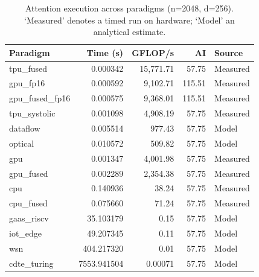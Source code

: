 \begin{table}[h]
\centering
\caption{Attention execution across paradigms (n=2048, d=256). `Measured' denotes a timed run on hardware; `Model' an analytical estimate.}
\begin{tabular}{lrrrl}
\hline
Paradigm & Time (s) & GFLOP/s & AI & Source \\
\hline
tpu\_fused & 0.000342 & 15,771.71 & 57.75 & Measured \\
gpu\_fp16 & 0.000592 & 9,102.71 & 115.51 & Measured \\
gpu\_fused\_fp16 & 0.000575 & 9,368.01 & 115.51 & Measured \\
tpu\_systolic & 0.001098 & 4,908.19 & 57.75 & Measured \\
dataflow & 0.005514 & 977.43 & 57.75 & Model \\
optical & 0.010572 & 509.82 & 57.75 & Model \\
gpu & 0.001347 & 4,001.98 & 57.75 & Measured \\
gpu\_fused & 0.002289 & 2,354.38 & 57.75 & Measured \\
cpu & 0.140936 & 38.24 & 57.75 & Measured \\
cpu\_fused & 0.075660 & 71.24 & 57.75 & Measured \\
gaas\_riscv & 35.103179 & 0.15 & 57.75 & Model \\
iot\_edge & 49.207345 & 0.11 & 57.75 & Model \\
wsn & 404.217320 & 0.01 & 57.75 & Model \\
cdte\_turing & 7553.941504 & 0.00071 & 57.75 & Model \\
\hline
\end{tabular}
\end{table}
